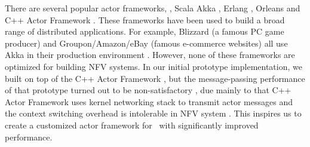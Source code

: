 
There are several popular actor frameworks, \eg, Scala Akka \cite{akka}, Erlang \cite{erlang}, Orleans \cite{Orleans} and C++ Actor Framework \cite{caf}. These frameworks have been used to build a broad range of distributed applications. %
 For example, Blizzard (a famous PC game producer) and Groupon/Amazon/eBay (famous e-commerce websites) all use Akka in their production environment \cite{akka}. However, none of these frameworks are optimized for building NFV systems. In our initial prototype implementation, we built \nfactor on top of the C++ Actor Framework \cite{caf}, but the message-passing performance of that prototype turned out to be non-satisfactory %
 , due mainly to that C++ Actor Framework uses kernel networking stack to transmit actor messages and the context switching overhead is intolerable in NFV system \cite{martins2014clickos}. This inspires us to create a customized actor framework for \nfactor~with  significantly improved performance.

